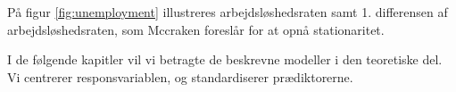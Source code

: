 På figur \ref{fig:unemployment} illustreres arbejdsløshedsraten samt 1. differensen af arbejdsløshedsraten, som Mccraken foreslår for at opnå stationaritet.
%


I de følgende kapitler vil vi betragte de beskrevne modeller i den teoretiske del.
Vi centrerer responsvariablen, og standardiserer prædiktorerne.